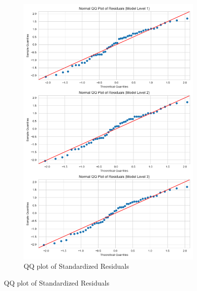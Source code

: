 \documentclass[11pt, oneside]{article}   	%
\begin{document}
\begin{figure}[H]
\begin{subfigure}{.5\textwidth}
  \includegraphics[width=\linewidth]{../plots/full_data/hierarchy8/qq_residuals}
  \caption{QQ plot of Standardized Residuals}
\end{subfigure}
\end{figure}
\end{document}
